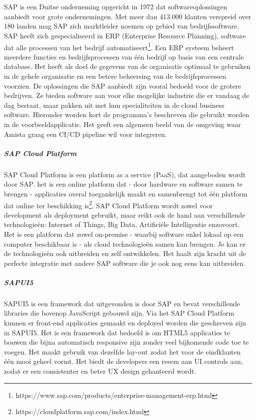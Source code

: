 \chapter{}
\label{ch:sap}
SAP is een Duitse onderneming opgericht in 1972 dat softwareoplossingen aanbiedt voor grote ondernemingen. Met meer dan 413.000 klanten verspreid over 180 landen mag SAP zich marktleider noemen op gebied van bedrijfssoftware.
SAP heeft zich gespecialiseerd in ERP (Enterprise Resource Planning), software dat alle processen van het bedrijf automatiseert\footnote{https://www.sap.com/products/enterprise-management-erp.html}. Een ERP systeem beheert meerdere functies en bedrijfsprocessen van één bedrijf op basis van een centrale database. Het heeft als doel de gegevens van de organisatie optimaal te gebruiken in de gehele organisatie en een betere beheersing van de bedrijfsprocessen voorzien.
De oplossingen die SAP aanbiedt zijn vooral bedoeld voor de grotere bedrijven. Ze bieden software aan voor elke mogelijke industrie die er vandaag de dag bestaat, maar pakken uit met hun specialiteiten in de cloud business software.
Hieronder worden kort de programma's beschreven die gebruikt worden in de voorbeeldapplicatie. Het geeft een algemeen beeld van de omgeving waar Amista graag een CI/CD pipeline wil voor integreren.

    \paragraph{SAP Cloud Platform}
    SAP Cloud Platform is een platform as a service (PaaS), dat aangeboden wordt door SAP. het is een online platform dat - door hardware en software samen te brengen - applicaties overal toegankelijk maakt en samenbrengt tot één platform dat online ter beschikking is\footnote{https://cloudplatform.sap.com/index.html}.
    SAP Cloud Platform wordt zowel voor development als deployment gebruikt, maar reikt ook de hand aan verschillende technologieën: Internet of Things, Big Data, Artificiële Intelligentie enzovoort. Het is een platform dat zowel on-premise - waarbij software enkel lokaal op een computer beschikbaar is - als cloud technologieën samen kan brengen. Je kan er de technologieën ook uitbreiden en zelf ontwikkelen. Het haalt zijn kracht uit de perfecte integratie met andere SAP software die je ook nog eens kan uitbreiden.
    
    \paragraph{SAPUI5}
    SAPUI5 is een framework dat uitgevonden is door SAP en bevat verschillende libraries die bovenop JavaScript gebouwd zijn. Via het SAP Cloud Platform kunnen er front-end applicaties gemaakt en deployed worden die geschreven zijn in SAPUI5. Het is een framework dat bedoeld is om HTML5 applicaties te bouwen die bijna automatisch responsive zijn zonder veel bijkomende code toe te voegen.
    Het maakt gebruik van dezelfde lay-out zodat het voor de eindklanten één mooi geheel vormt. Het biedt de developers een resem aan UI controls aan, zodat er een consistenter en beter UX design gehanteerd wordt.~\autocite{SAPSEa} 
    
